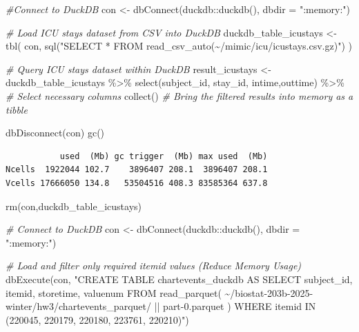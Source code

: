 \documentclass[
]{article}
\newenvironment{Shaded}{\begin{snugshade}}{\end{snugshade}}
\newcommand{\AttributeTok}[1]{\textcolor[rgb]{0.77,0.63,0.00}{#1}}
\newcommand{\CommentTok}[1]{\textcolor[rgb]{0.56,0.35,0.01}{\textit{#1}}}
\newcommand{\FunctionTok}[1]{\textcolor[rgb]{0.00,0.00,0.00}{#1}}
\newcommand{\NormalTok}[1]{\textcolor[rgb]{0.00,0.00,0.00}{#1}}
\newcommand{\OtherTok}[1]{\textcolor[rgb]{0.56,0.35,0.01}{#1}}
\newcommand{\SpecialCharTok}[1]{\textcolor[rgb]{0.00,0.00,0.00}{#1}}
\newcommand{\StringTok}[1]{\textcolor[rgb]{0.31,0.60,0.02}{#1}}
\begin{document}
\begin{Shaded}
\begin{Highlighting}[]
\CommentTok{\#Connect to DuckDB}
\NormalTok{con }\OtherTok{\textless{}{-}} \FunctionTok{dbConnect}\NormalTok{(duckdb}\SpecialCharTok{::}\FunctionTok{duckdb}\NormalTok{(), }\AttributeTok{dbdir =} \StringTok{":memory:"}\NormalTok{)}

\CommentTok{\# Load ICU stays dataset from CSV into DuckDB}
\NormalTok{duckdb\_table\_icustays }\OtherTok{\textless{}{-}} \FunctionTok{tbl}\NormalTok{(}
\NormalTok{  con, }\FunctionTok{sql}\NormalTok{(}\StringTok{"SELECT * FROM read\_csv\_auto(\textquotesingle{}\textasciitilde{}/mimic/icu/icustays.csv.gz\textquotesingle{})"}\NormalTok{)}
\NormalTok{  )}

\CommentTok{\# Query ICU stays dataset within DuckDB}
\NormalTok{result\_icustays }\OtherTok{\textless{}{-}}\NormalTok{ duckdb\_table\_icustays }\SpecialCharTok{\%\textgreater{}\%}
  \FunctionTok{select}\NormalTok{(subject\_id, stay\_id, intime,outtime) }\SpecialCharTok{\%\textgreater{}\%}  \CommentTok{\# Select necessary columns}
  \FunctionTok{collect}\NormalTok{()  }\CommentTok{\# Bring the filtered results into memory as a tibble}

\FunctionTok{dbDisconnect}\NormalTok{(con)}
\FunctionTok{gc}\NormalTok{()}
\end{Highlighting}
\end{Shaded}

\begin{verbatim}
           used  (Mb) gc trigger  (Mb) max used  (Mb)
Ncells  1922044 102.7    3896407 208.1  3896407 208.1
Vcells 17666050 134.8   53504516 408.3 83585364 637.8
\end{verbatim}

\begin{Shaded}
\begin{Highlighting}[]
\FunctionTok{rm}\NormalTok{(con,duckdb\_table\_icustays)}
\end{Highlighting}
\end{Shaded}

\begin{Shaded}
\begin{Highlighting}[]
\CommentTok{\# Connect to DuckDB}
\NormalTok{con }\OtherTok{\textless{}{-}} \FunctionTok{dbConnect}\NormalTok{(duckdb}\SpecialCharTok{::}\FunctionTok{duckdb}\NormalTok{(), }\AttributeTok{dbdir =} \StringTok{":memory:"}\NormalTok{) }

\CommentTok{\#  Load and filter only required \textasciigrave{}itemid\textasciigrave{} values (Reduce Memory Usage)}
\FunctionTok{dbExecute}\NormalTok{(con, }\StringTok{"CREATE TABLE chartevents\_duckdb AS }
\StringTok{                SELECT subject\_id, itemid, storetime, valuenum }
\StringTok{                FROM read\_parquet(}
\StringTok{    \textquotesingle{}\textasciitilde{}/biostat{-}203b{-}2025{-}winter/hw3/chartevents\_parquet/\textquotesingle{} || }
\StringTok{    \textquotesingle{}part{-}0.parquet\textquotesingle{}}
\StringTok{  )}
\StringTok{                WHERE itemid IN (220045, 220179, 220180, 223761, 220210)"}\NormalTok{)}
\end{Highlighting}
\end{Shaded}
\end{document}
